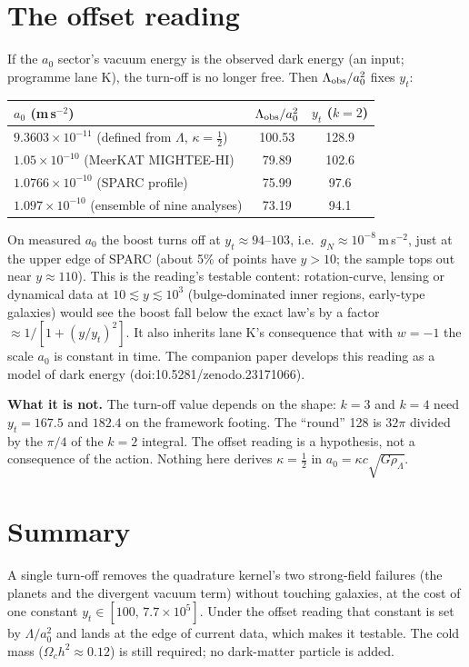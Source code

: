\documentclass[10pt]{article}
\begin{document}
\section{The offset reading}
If the $a_0$ sector's vacuum energy is the observed dark energy (an input; programme lane K), the turn-off is no longer free. Then $\Lambda_{\rm obs}/a_0^2$ fixes $y_t$:
\begin{center}
\begin{tabular}{lcc}
\toprule
$a_0$ (m\,s$^{-2}$) & $\Lambda_{\rm obs}/a_0^2$ & $y_t$ ($k=2$)\\
\midrule
$9.3603\times10^{-11}$ (defined from $\Lambda$, $\kappa=\tfrac12$) & 100.53 & 128.9\\
$1.05\times10^{-10}$ (MeerKAT MIGHTEE-HI) & 79.89 & 102.6\\
$1.0766\times10^{-10}$ (SPARC profile) & 75.99 & 97.6\\
$1.097\times10^{-10}$ (ensemble of nine analyses) & 73.19 & 94.1\\
\bottomrule
\end{tabular}
\end{center}
On measured $a_0$ the boost turns off at $y_t\approx94$--$103$, i.e.\ $g_N\approx10^{-8}$\,m\,s$^{-2}$, just at the upper edge of SPARC (about 5\% of points have $y>10$; the sample tops out near $y\approx110$). This is the reading's testable content: rotation-curve, lensing or dynamical data at $10\lesssim y\lesssim10^3$ (bulge-dominated inner regions, early-type galaxies) would see the boost fall below the exact law's by a factor $\approx1/[1+(y/y_t)^2]$. It also inherits lane K's consequence that with $w=-1$ the scale $a_0$ is constant in time. The companion paper develops this reading as a model of dark energy (doi:10.5281/zenodo.23171066).

\textbf{What it is not.} The turn-off value depends on the shape: $k=3$ and $k=4$ need $y_t=167.5$ and $182.4$ on the framework footing. The ``round'' 128 is $32\pi$ divided by the $\pi/4$ of the $k=2$ integral. The offset reading is a hypothesis, not a consequence of the action. Nothing here derives $\kappa=\tfrac12$ in $a_0=\kappa c\sqrt{G\rho_\Lambda}$.

\section{Summary}
A single turn-off removes the quadrature kernel's two strong-field failures (the planets and the divergent vacuum term) without touching galaxies, at the cost of one constant $y_t\in[100,\,7.7\times10^5]$. Under the offset reading that constant is set by $\Lambda/a_0^2$ and lands at the edge of current data, which makes it testable. The cold mass ($\Omega_ch^2\approx0.12$) is still required; no dark-matter particle is added.
\end{document}
